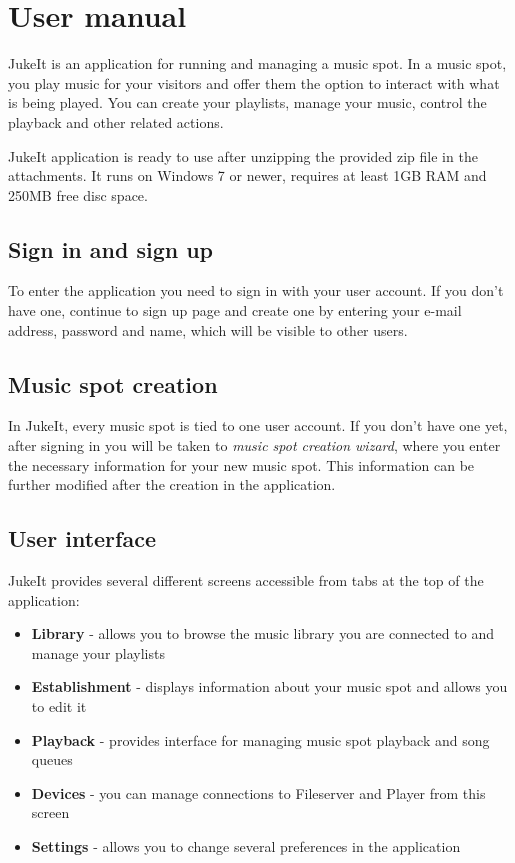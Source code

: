 \chapter{User manual}

JukeIt is an application for running and managing a music spot. In a music spot, you play music for your visitors and offer them the option to interact with what is being played. You can create your playlists, manage your music, control the playback and other related actions.
\par
JukeIt application is ready to use after unzipping the provided zip file in the attachments. It runs on Windows 7 or newer, requires at least 1GB RAM and 250MB free disc space.

\section{Sign in and sign up}

To enter the application you need to sign in with your user account. If you don't have one, continue to sign up page and create one by entering your e-mail address, password and name, which will be visible to other users.

\section{Music spot creation}

In JukeIt, every music spot is tied to one user account. If you don't have one yet, after signing in you will be taken to \emph{music spot creation wizard}, where you enter the necessary information for your new music spot. This information can be further modified after the creation in the application.

\section{User interface}

JukeIt provides several different screens accessible from tabs at the top of the application:
\begin{itemize}
    \item \textbf{Library} - allows you to browse the music library you are connected to and manage your playlists
    \item \textbf{Establishment} - displays information about your music spot and allows you to edit it
    \item \textbf{Playback} - provides interface for managing music spot playback and song queues
    \item \textbf{Devices} - you can manage connections to Fileserver and Player from this screen
    \item \textbf{Settings} - allows you to change several preferences in the application
\end{itemize}

